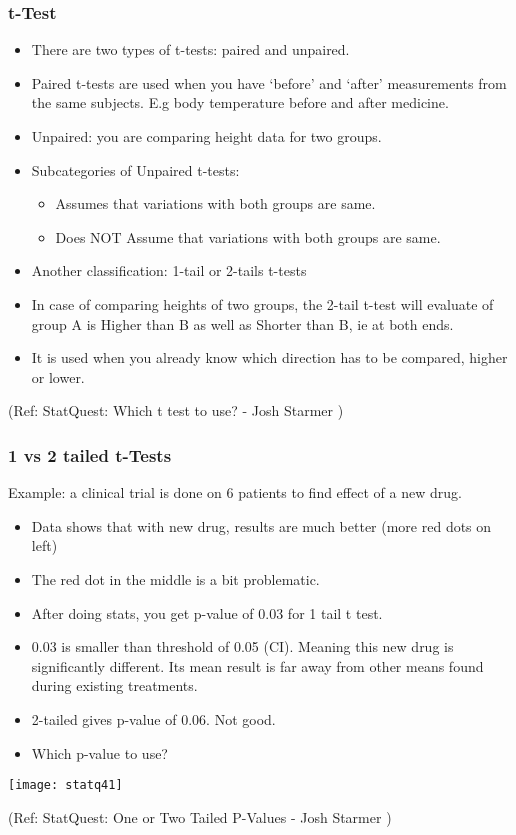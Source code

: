 \begin{frame}[fragile]\frametitle{t-Test}

	\begin{itemize}
	
	\item There are two types of t-tests: paired and unpaired.
	\item Paired t-tests are used when you have `before' and `after' measurements from the same subjects. E.g body temperature before and after medicine.
	\item Unpaired: you are comparing height data for two groups. 
	\item Subcategories of Unpaired t-tests:
	\begin{itemize}
	\item Assumes that variations with both groups are same.
	\item Does NOT Assume that variations with both groups are same.
	\end{itemize}
	\item Another classification: 1-tail or 2-tails t-tests
	\item In case of comparing heights of two groups, the 2-tail t-test will evaluate of group A is Higher than B as well as Shorter than B, ie at both ends.
	\item It is used when you already know which direction has to be compared, higher or lower.
	\end{itemize}
  
 
\tiny{(Ref: StatQuest: Which t test to use? - Josh Starmer )}
\end{frame}

\begin{frame}[fragile]\frametitle{1 vs 2 tailed t-Tests}
Example: a clinical trial is done on 6 patients to find effect of a new drug.


	\begin{itemize}
	\item Data shows that with new drug, results are much better (more red dots on left)
	\item The red dot in the middle is a bit problematic.
	\item After doing stats, you get p-value of 0.03 for 1 tail t test. 
	\item 0.03 is smaller than threshold of 0.05 (CI). Meaning this new drug is significantly different. Its mean result is far away from other means found during existing treatments.
	\item 2-tailed gives p-value of 0.06. Not good.
	\item Which p-value to use?
	\end{itemize}

      \begin{center}
      \texttt{[image: statq41]}
	  	\end{center}

\tiny{(Ref: StatQuest: One or Two Tailed P-Values - Josh Starmer )}
\end{frame}

